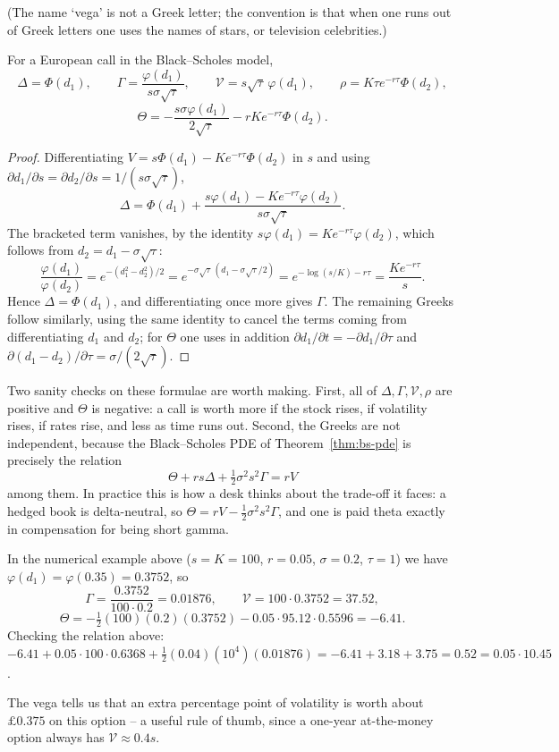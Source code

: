 \documentclass[a4paper]{scrartcl}
\begin{document}
(The name `vega' is not a Greek letter; the convention is that when one runs out of Greek letters one uses the names of stars, or television celebrities.)

\begin{proposition}\label{prop:greeks}
	For a European call in the Black--Scholes model,
	$$
	\Delta = \Phi(d_1), \qquad \Gamma = \frac{\varphi(d_1)}{s\sigma\sqrt\tau}, \qquad \mathcal{V} = s\sqrt\tau\,\varphi(d_1), \qquad \rho = K\tau e^{-r\tau}\Phi(d_2),
	$$
	$$
	\Theta = -\frac{s\sigma\varphi(d_1)}{2\sqrt\tau} - rKe^{-r\tau}\Phi(d_2).
	$$
\end{proposition}

\begin{proof}
	Differentiating $V = s\Phi(d_1) - Ke^{-r\tau}\Phi(d_2)$ in $s$ and using $\partial d_1/\partial s = \partial d_2/\partial s = 1/(s\sigma\sqrt\tau)$,
	$$
	\Delta = \Phi(d_1) + \frac{s\varphi(d_1) - Ke^{-r\tau}\varphi(d_2)}{s\sigma\sqrt\tau}.
	$$
	The bracketed term vanishes, by the identity $s\varphi(d_1) = Ke^{-r\tau}\varphi(d_2)$, which follows from $d_2 = d_1 - \sigma\sqrt\tau$:
	$$
	\frac{\varphi(d_1)}{\varphi(d_2)} = e^{-(d_1^2-d_2^2)/2} = e^{-\sigma\sqrt\tau\,(d_1 - \sigma\sqrt\tau/2)} = e^{-\log(s/K) - r\tau} = \frac{K e^{-r\tau}}{s}.
	$$
	Hence $\Delta = \Phi(d_1)$, and differentiating once more gives $\Gamma$. The remaining Greeks follow similarly, using the same identity to cancel the terms coming from differentiating $d_1$ and $d_2$; for $\Theta$ one uses in addition $\partial d_1/\partial t = -\partial d_1/\partial\tau$ and $\partial(d_1 - d_2)/\partial \tau = \sigma/(2\sqrt\tau)$.
\end{proof}

Two sanity checks on these formulae are worth making. First, all of $\Delta,\Gamma,\mathcal{V},\rho$ are positive and $\Theta$ is negative: a call is worth more if the stock rises, if volatility rises, if rates rise, and less as time runs out. Second, the Greeks are not independent, because the Black--Scholes PDE of Theorem~\ref{thm:bs-pde} is precisely the relation
$$
\Theta + rs\Delta + \tfrac12\sigma^2s^2\Gamma = rV
$$
among them. In practice this is how a desk thinks about the trade-off it faces: a hedged book is delta-neutral, so $\Theta = rV - \tfrac12\sigma^2s^2\Gamma$, and one is paid theta exactly in compensation for being short gamma.

\begin{example}
	In the numerical example above ($s = K = 100$, $r=0.05$, $\sigma=0.2$, $\tau=1$) we have $\varphi(d_1) = \varphi(0.35) = 0.3752$, so
	$$
	\Gamma = \frac{0.3752}{100\cdot0.2} = 0.01876, \qquad \mathcal{V} = 100\cdot 0.3752 = 37.52,
	$$
	$$
	\Theta = -\tfrac12(100)(0.2)(0.3752) - 0.05\cdot 95.12\cdot 0.5596 = -6.41.
	$$
	Checking the relation above: $-6.41 + 0.05\cdot100\cdot0.6368 + \tfrac12(0.04)(10^4)(0.01876) = -6.41+3.18+3.75 = 0.52 = 0.05\cdot 10.45$. \checkmark

	The vega tells us that an extra percentage point of volatility is worth about $\pounds 0.375$ on this option -- a useful rule of thumb, since a one-year at-the-money option always has $\mathcal{V} \approx 0.4 s$.
\end{example}
\end{document}
